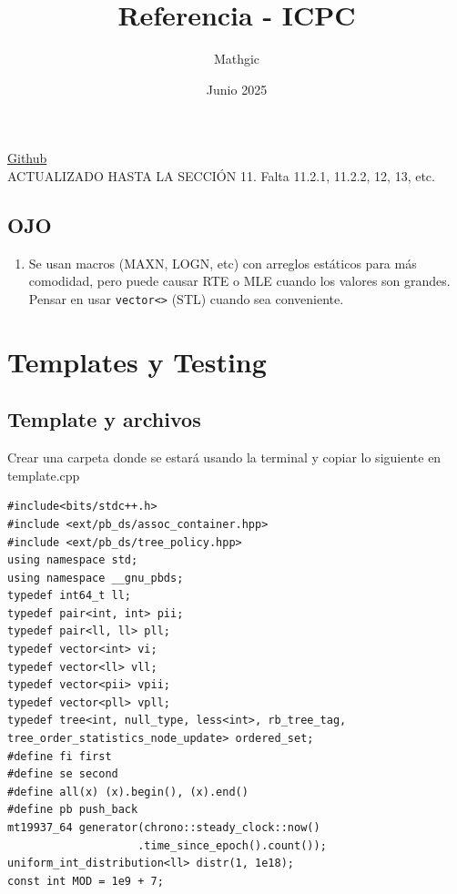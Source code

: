 \documentclass[10pt,spanish,mexico]{article}
\title{Referencia - ICPC}
\author{Mathgic}
\date{Junio 2025}
\numberwithin{equation}{section}
\begin{document}
\maketitle

\begin{center}
    \href{https://github.com/SJMA11723/Data-structures-and-algorithms}{Github}
    \\ACTUALIZADO HASTA LA SECCIÓN 11. Falta 11.2.1, 11.2.2, 12, 13, etc.
\end{center}

\newpage
\tableofcontents

\newpage
{}

\begin{multicols}{2}

\subsection{OJO}
\begin{enumerate}[1.]
    \item Se usan macros (MAXN, LOGN, etc) con arreglos estáticos para más comodidad, pero puede causar RTE o MLE cuando los valores son grandes. Pensar en usar \texttt{vector<>} (STL) cuando sea conveniente.
\end{enumerate}

\hrulefill
\section{Templates y Testing}
\subsection{Template y archivos}
Crear una carpeta donde se estará usando la terminal y copiar lo siguiente en template.cpp
 \begin{verbatim}
#include<bits/stdc++.h>
#include <ext/pb_ds/assoc_container.hpp>
#include <ext/pb_ds/tree_policy.hpp>
using namespace std;
using namespace __gnu_pbds;
typedef int64_t ll;
typedef pair<int, int> pii;
typedef pair<ll, ll> pll;
typedef vector<int> vi;
typedef vector<ll> vll;
typedef vector<pii> vpii;
typedef vector<pll> vpll;
typedef tree<int, null_type, less<int>, rb_tree_tag, tree_order_statistics_node_update> ordered_set;
#define fi first
#define se second
#define all(x) (x).begin(), (x).end()
#define pb push_back
mt19937_64 generator(chrono::steady_clock::now()
                    .time_since_epoch().count());
uniform_int_distribution<ll> distr(1, 1e18);
const int MOD = 1e9 + 7;
 \end{verbatim}


\end{multicols}
\end{document}
